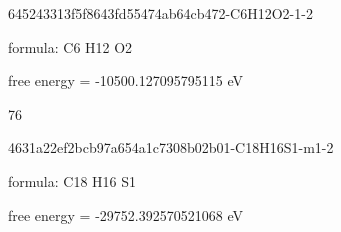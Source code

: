 \documentclass{article}
\begin{document}
\vspace{1cm}


645243313f5f8643fd55474ab64cb472-C6H12O2-1-2



formula: C6 H12 O2



free energy = -10500.127095795115 eV

76

\vspace{1cm}


4631a22ef2bcb97a654a1c7308b02b01-C18H16S1-m1-2



formula: C18 H16 S1



free energy = -29752.392570521068 eV
\end{document}
